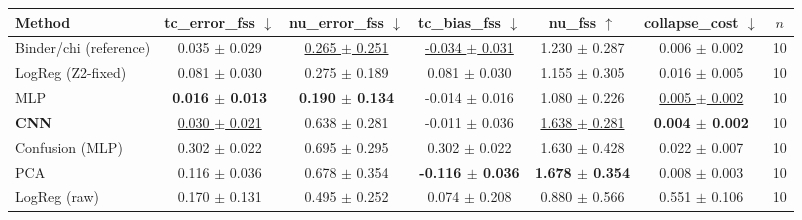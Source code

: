 \begin{tabular}{lcccccc}
\toprule
Method & tc\_error\_fss $\downarrow$ & nu\_error\_fss $\downarrow$ & tc\_bias\_fss $\downarrow$ & nu\_fss $\uparrow$ & collapse\_cost $\downarrow$ & $n$ \\
\midrule
Binder/chi (reference) & 0.035 $\pm$ 0.029 & \underline{0.265 $\pm$ 0.251} & \underline{-0.034 $\pm$ 0.031} & 1.230 $\pm$ 0.287 & 0.006 $\pm$ 0.002 & 10 \\
LogReg (Z2-fixed) & 0.081 $\pm$ 0.030 & 0.275 $\pm$ 0.189 & 0.081 $\pm$ 0.030 & 1.155 $\pm$ 0.305 & 0.016 $\pm$ 0.005 & 10 \\
MLP & \textbf{0.016 $\pm$ 0.013} & \textbf{0.190 $\pm$ 0.134} & -0.014 $\pm$ 0.016 & 1.080 $\pm$ 0.226 & \underline{0.005 $\pm$ 0.002} & 10 \\
\textbf{CNN} & \underline{0.030 $\pm$ 0.021} & 0.638 $\pm$ 0.281 & -0.011 $\pm$ 0.036 & \underline{1.638 $\pm$ 0.281} & \textbf{0.004 $\pm$ 0.002} & 10 \\
Confusion (MLP) & 0.302 $\pm$ 0.022 & 0.695 $\pm$ 0.295 & 0.302 $\pm$ 0.022 & 1.630 $\pm$ 0.428 & 0.022 $\pm$ 0.007 & 10 \\
PCA & 0.116 $\pm$ 0.036 & 0.678 $\pm$ 0.354 & \textbf{-0.116 $\pm$ 0.036} & \textbf{1.678 $\pm$ 0.354} & 0.008 $\pm$ 0.003 & 10 \\
LogReg (raw) & 0.170 $\pm$ 0.131 & 0.495 $\pm$ 0.252 & 0.074 $\pm$ 0.208 & 0.880 $\pm$ 0.566 & 0.551 $\pm$ 0.106 & 10 \\
\bottomrule
\end{tabular}

